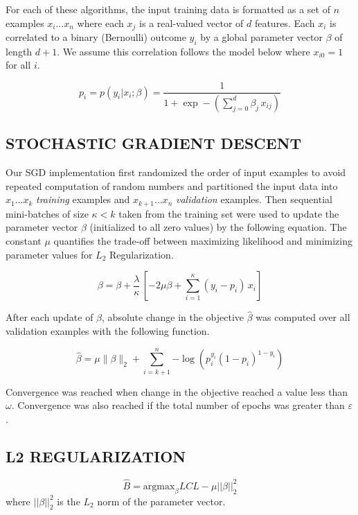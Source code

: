 For each of these algorithms, the input training data is formatted as a set of $n$ examples $x_i \ldots x_n$ where each $x_j$ is a real-valued vector of $d$ features. Each $x_i$ is correlated to a binary (Bernoulli) outcome $y_i$ by a global parameter vector $\beta$ of length $d+1$. We assume this correlation follows the model below where $x_{i0}=1$ for all $i$.

\begin{equation}
    p_i = p(y_i|x_i;\beta) = \frac{1}{1+\exp-(\sum_{j=0}^{d} \beta_j\,x_{ij})}
\end{equation}


\subsection{STOCHASTIC GRADIENT DESCENT}
Our SGD implementation first randomized the order of input examples to avoid repeated computation of random numbers and partitioned the input data into $x_1 \ldots x_k$ \emph{training} examples and $x_{k+1} \ldots x_n$ \emph{validation} examples. Then sequential mini-batches of size $\kappa < k$ taken from the training set were used to update the parameter vector $\beta$ (initialized to all zero values) by the following equation. The constant $\mu$ quantifies the trade-off between maximizing likelihood and minimizing parameter values for $L_2$ Regularization.

\begin{equation}
    \beta = \beta + \frac{\lambda}{\kappa}\,[-2 \mu \beta + \sum_{i=1}^{\kappa} (y_i - p_i)\,x_i]
\end{equation}

After each update of $\beta$, absolute change in the objective $\widehat{\beta}$ was computed over all validation examples with the following function.

\begin{equation}
    \widehat{\beta} = \mu \|\beta\|_2 + \sum_{i=k+1}^{n}{-\log(p_i^{y_i}(1 - p_i)^{1-y_i})}
\end{equation}

Convergence was reached when change in the objective reached a value less than $\omega$. Convergence was also reached if the total number of epochs was greater than $\varepsilon$.

\subsection{L2 REGULARIZATION}
\begin{equation}
    \hat{B} = \textrm{argmax}_{\beta} LCL - \mu||\beta||_2^2
\end{equation}
where $||\beta||_2^2$ is the $L_2$ norm of the parameter vector.



